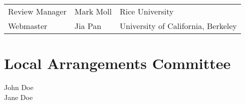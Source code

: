 \begin{tabular}{>{\raggedleft}p{5cm}p{4.5cm}>{\small}p{7cm}}
Review Manager & Mark Moll & Rice University\\
Webmaster &Jia Pan& University of California, Berkeley\\
\end{tabular}


\vspace{2cm}

\section{Local Arrangements Committee}
\hspace{0.14\textwidth}

\begin{multicols}{4}

{
\noindent
John Doe\\
Jane Doe\\
}
\end{multicols}
\vfill

